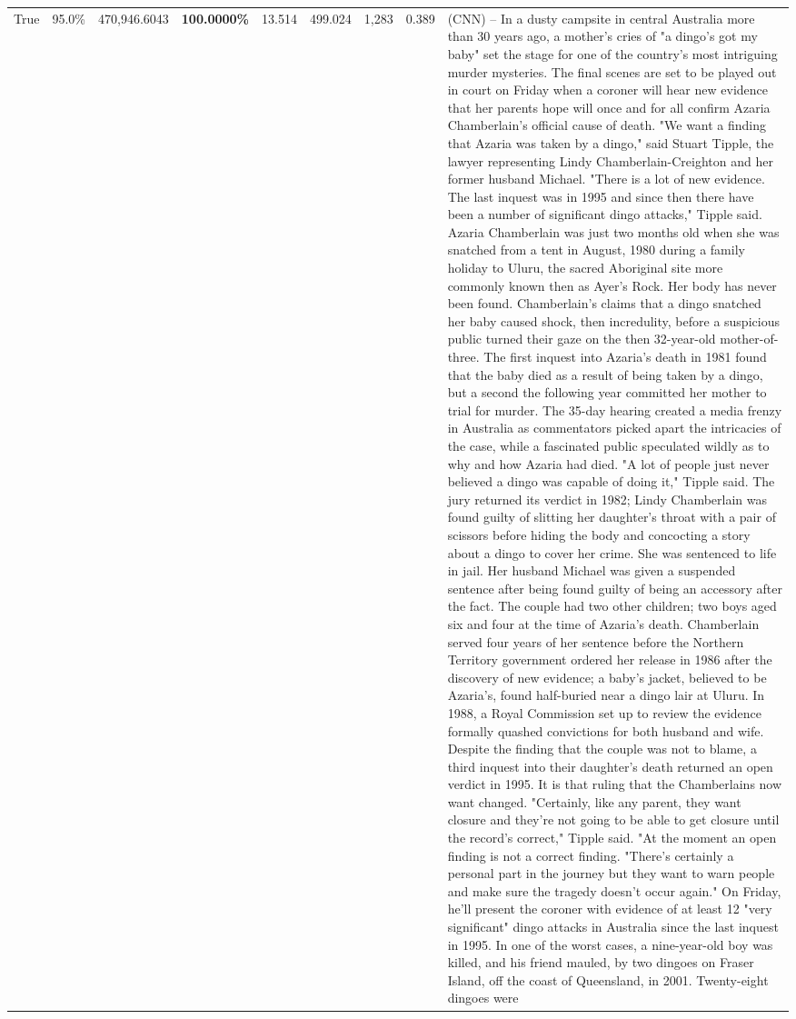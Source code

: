 \begin{table}[H]
\begin{tabular}{lllrlllll}
True & 95.0\% & 470,946.6043 & \bfseries \color{red} 100.0000\% & 13.514 & 499.024 & 1,283 & 0.389 & (CNN) -- In a dusty campsite in central Australia more than 30 years ago, a mother's cries of "a dingo's got my baby" set the stage for one of the country's most intriguing murder mysteries. The final scenes are set to be played out in court on Friday when a coroner will hear new evidence that her parents hope will once and for all confirm Azaria Chamberlain's official cause of death. "We want a finding that Azaria was taken by a dingo," said Stuart Tipple, the lawyer representing Lindy Chamberlain-Creighton and her former husband Michael. "There is a lot of new evidence. The last inquest was in 1995 and since then there have been a number of significant dingo attacks," Tipple said. Azaria Chamberlain was just two months old when she was snatched from a tent in August, 1980 during a family holiday to Uluru, the sacred Aboriginal site more commonly known then as Ayer's Rock. Her body has never been found. Chamberlain's claims that a dingo snatched her baby caused shock, then incredulity, before a suspicious public turned their gaze on the then 32-year-old mother-of-three. The first inquest into Azaria's death in 1981 found that the baby died as a result of being taken by a dingo, but a second the following year committed her mother to trial for murder. The 35-day hearing created a media frenzy in Australia as commentators picked apart the intricacies of the case, while a fascinated public speculated wildly as to why and how Azaria had died. "A lot of people just never believed a dingo was capable of doing it," Tipple said. The jury returned its verdict in 1982; Lindy Chamberlain was found guilty of slitting her daughter's throat with a pair of scissors before hiding the body and concocting a story about a dingo to cover her crime. She was sentenced to life in jail. Her husband Michael was given a suspended sentence after being found guilty of being an accessory after the fact. The couple had two other children; two boys aged six and four at the time of Azaria's death. Chamberlain served four years of her sentence before the Northern Territory government ordered her release in 1986 after the discovery of new evidence; a baby's jacket, believed to be Azaria's, found half-buried near a dingo lair at Uluru. In 1988, a Royal Commission set up to review the evidence formally quashed convictions for both husband and wife. Despite the finding that the couple was not to blame, a third inquest into their daughter's death returned an open verdict in 1995. It is that ruling that the Chamberlains now want changed. "Certainly, like any parent, they want closure and they're not going to be able to get closure until the record's correct," Tipple said. "At the moment an open finding is not a correct finding. "There's certainly a personal part in the journey but they want to warn people and make sure the tragedy doesn't occur again." On Friday, he'll present the coroner with evidence of at least 12 "very significant" dingo attacks in Australia since the last inquest in 1995. In one of the worst cases, a nine-year-old boy was killed, and his friend mauled, by two dingoes on Fraser Island, off the coast of Queensland, in 2001. Twenty-eight dingoes were 
\end{tabular}
\end{table}
